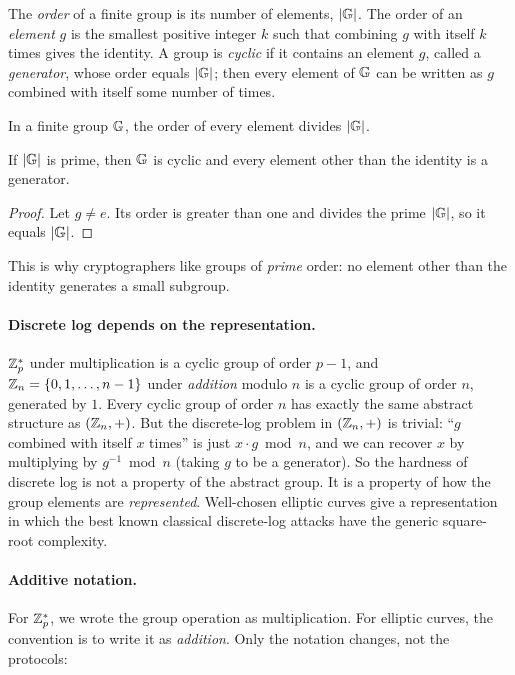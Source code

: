 The \emph{order} of a finite group is its number of elements, $|\mathbb{G}|$.
The order of an \emph{element} $g$ is the smallest positive integer $k$
such that combining $g$ with itself $k$ times gives the identity.
A group is \emph{cyclic} if it contains an element $g$, called a
\emph{generator}, whose order equals $|\mathbb{G}|$; then every element of $\mathbb{G}$
can be written as $g$ combined with itself some number of times.

\begin{theorem}[Lagrange]\label{thm:lagrange}
In a finite group $\mathbb{G}$, the order of every element divides $|\mathbb{G}|$.
\end{theorem}

\begin{corollary}\label{cor:primeorder}
If $|\mathbb{G}|$ is prime, then $\mathbb{G}$ is cyclic and every element other than
the identity is a generator.
\end{corollary}
\begin{proof}
Let $g \neq e$. Its order is greater than one and divides the prime
$|\mathbb{G}|$, so it equals $|\mathbb{G}|$.
\end{proof}

This is why cryptographers like groups of \emph{prime} order: no
element other than the identity generates a small subgroup.

\paragraph{Discrete log depends on the representation.}
$\mathbb{Z}^*_p$ under multiplication is a cyclic group of order $p - 1$, and
$\mathbb{Z}_n = \{0, 1, \dots, n-1\}$ under \emph{addition} modulo $n$ is a
cyclic group of order $n$, generated by $1$.
Every cyclic group of order $n$ has exactly the same abstract structure as
$(\mathbb{Z}_n, +)$.
But the discrete-log problem in $(\mathbb{Z}_n, +)$ is trivial: ``$g$ combined
with itself $x$ times'' is just $x \cdot g \bmod n$, and we can recover
$x$ by multiplying by $g^{-1} \bmod n$ (taking $g$ to be a generator).
So the hardness of discrete log is not a property of the abstract group.
It is a property of how the group elements are \emph{represented}.
Well-chosen elliptic curves give a representation in which the best known
classical discrete-log attacks have the generic square-root complexity.

\paragraph{Additive notation.}
For $\mathbb{Z}^*_p$, we wrote the group operation as multiplication.
For elliptic curves, the convention is to write it as \emph{addition}.
Only the notation changes, not the protocols:

